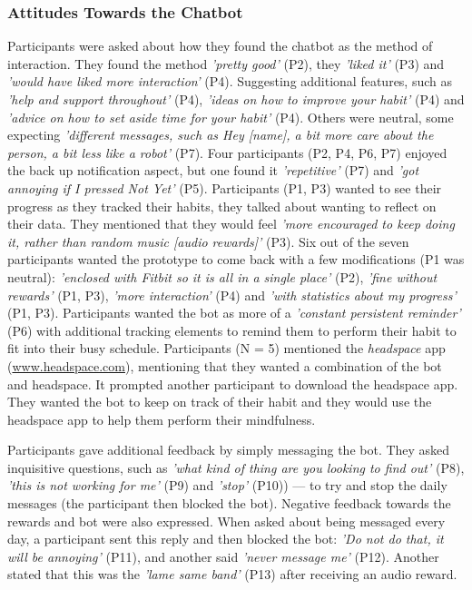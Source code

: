 \documentclass{scaffold/sigchi}
\begin{document}
\subsubsection{Attitudes Towards the Chatbot}
Participants were asked about how they found the chatbot as the method of interaction. They found the method \textit{'pretty good'} (P2), they \textit{'liked it'} (P3) and \textit{'would have liked more interaction'} (P4). Suggesting additional features, such as \textit{'help and support throughout'} (P4), \textit{'ideas on how to improve your habit'} (P4) and \textit{'advice on how to set aside time for your habit'} (P4). Others were neutral, some expecting \textit{'different messages, such as Hey [name], a bit more care about the person, a bit less like a robot'} (P7). Four participants (P2, P4, P6, P7) enjoyed the back up notification aspect, but one found it \textit{'repetitive'} (P7) and \textit{'got annoying if I pressed Not Yet'} (P5). Participants (P1, P3) wanted to see their progress as they tracked their habits, they talked about wanting to reflect on their data. They mentioned that they would feel \textit{'more encouraged to keep doing it, rather than random music [audio rewards]'} (P3). Six out of the seven participants wanted the prototype to come back with a few modifications (P1 was neutral): \textit{'enclosed with Fitbit so it is all in a single place'} (P2), \textit{'fine without rewards'} (P1, P3), \textit{'more interaction'} (P4) and \textit{'with statistics about my progress'} (P1, P3). Participants wanted the bot as more of a \textit{'constant persistent reminder'} (P6) with additional tracking elements to remind them to perform their habit to fit into their busy schedule. Participants (N = 5) mentioned the \textit{headspace} app (\url{www.headspace.com}), mentioning that they wanted a combination of the bot and headspace. It prompted another participant to download the headspace app. They wanted the bot to keep on track of their habit and they would use the headspace app to help them perform their mindfulness.

Participants gave additional feedback by simply messaging the bot. They asked inquisitive questions, such as \textit{'what kind of thing are you looking to find out'} (P8), \textit{'this is not working for me'} (P9) and \textit{'stop'} (P10)) --- to try and stop the daily messages (the participant then blocked the bot). Negative feedback towards the rewards and bot were also expressed. When asked about being messaged every day, a participant sent this reply and then blocked the bot: \textit{'Do not do that, it will be annoying'} (P11), and another said \textit{'never message me'} (P12). Another stated that this was the \textit{'lame same band'} (P13) after receiving an audio reward.
\end{document}
